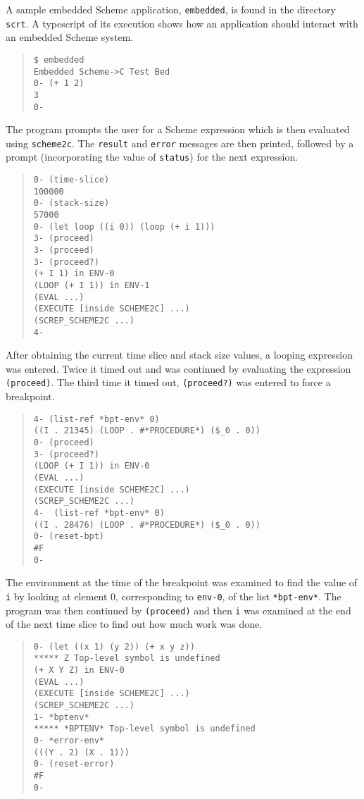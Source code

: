 \documentclass[12pt]{article}
\begin{document}
A sample embedded Scheme application, \texttt{embedded}, is found in
the directory \texttt{scrt}.  A typescript of its execution shows
how an application should interact with an embedded Scheme system.
\begin{quote}
\begin{verbatim}
$ embedded
Embedded Scheme->C Test Bed
0- (+ 1 2)
3
0-
\end{verbatim}
\end{quote}
The program prompts the user for a Scheme expression which is then
evaluated using \texttt{scheme2c}.  The \texttt{result} and
\texttt{error} messages are then printed, followed by a prompt
(incorporating the value of \texttt{status}) for the next expression.
\begin{quote}
\begin{verbatim}
0- (time-slice)
100000
0- (stack-size)
57000
0- (let loop ((i 0)) (loop (+ i 1)))
3- (proceed)
3- (proceed)
3- (proceed?)
(+ I 1) in ENV-0
(LOOP (+ I 1)) in ENV-1
(EVAL ...)
(EXECUTE [inside SCHEME2C] ...)
(SCREP_SCHEME2C ...)
4-
\end{verbatim}
\end{quote}
After obtaining the current time slice and stack size values, a
looping expression was entered.  Twice it timed out and was continued
by evaluating the expression \texttt{(proceed)}.  The third time it
timed out, \texttt{(proceed?)} was entered to force a breakpoint.
\begin{quote}
\begin{verbatim}
4- (list-ref *bpt-env* 0)
((I . 21345) (LOOP . #*PROCEDURE*) ($_0 . 0))
0- (proceed)
3- (proceed?)
(LOOP (+ I 1)) in ENV-0
(EVAL ...)
(EXECUTE [inside SCHEME2C] ...)
(SCREP_SCHEME2C ...)
4-  (list-ref *bpt-env* 0)
((I . 28476) (LOOP . #*PROCEDURE*) ($_0 . 0))
0- (reset-bpt)
#F
0-
\end{verbatim}
\end{quote}
The environment at the time of the breakpoint was examined to find the
value of \texttt{i} by looking at element 0, corresponding to
\texttt{env-0}, of the list \texttt{*bpt-env*}.  The program was then
continued by \texttt{(proceed)} and then \texttt{i} was examined at the
end of the next time slice to find out how much work was done.
\begin{quote}
\begin{verbatim}
0- (let ((x 1) (y 2)) (+ x y z))
***** Z Top-level symbol is undefined
(+ X Y Z) in ENV-0
(EVAL ...)
(EXECUTE [inside SCHEME2C] ...)
(SCREP_SCHEME2C ...)
1- *bptenv*
***** *BPTENV* Top-level symbol is undefined
0- *error-env*
(((Y . 2) (X . 1)))
0- (reset-error)
#F
0-
\end{verbatim}
\end{quote}
\end{document}
